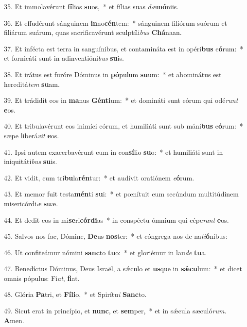 35. Et immolavérunt \textbf{fí}lios \textbf{su}os,~*  et fílias suas \textit{dæ}\textbf{mó}niis.\

36. Et effudérunt sánguinem \textbf{in}no\textbf{cén}tem:~*  sánguinem filiórum suórum et filiárum suárum, quas sacrificavérunt sculptíli\textit{bus} \textbf{Chá}naan.\

37. Et infécta est terra in sanguínibus, et contamináta est in opéri\textbf{bus} e\textbf{ó}rum:~*  et fornicáti sunt in adinventióni\textit{bus} \textbf{su}is.\

38. Et irátus est furóre Dóminus in \textbf{pó}pulum \textbf{su}um:~*  et abominátus est hereditá\textit{tem} \textbf{su}am.\

39. Et trádidit eos in \textbf{ma}nus \textbf{Gén}\textbf{ti}um:~*  et domináti sunt eórum qui odé\textit{runt} \textbf{e}os.\

40. Et tribulavérunt eos inimíci eórum, et humiliáti sunt sub máni\textbf{bus} e\textbf{ó}rum:~*  sæpe liberá\textit{vit} \textbf{e}os.\

41. Ipsi autem exacerbavérunt eum in con\textbf{sí}lio \textbf{su}o:~*  et humiliáti sunt in iniquitáti\textit{bus} \textbf{su}is.\

42. Et vidit, cum tri\textbf{bu}la\textbf{rén}tur:~*  et audívit oratiónem \textit{e}\textbf{ó}rum.\

43. Et memor fuit testa\textbf{mén}ti \textbf{su}i:~*  et pœnítuit eum secúndum multitúdinem misericórdi\textit{æ} \textbf{su}æ.\

44. Et dedit eos in mi\textbf{se}ri\textbf{cór}\textbf{di}as~*  in conspéctu ómnium qui cépe\textit{rant} \textbf{e}os.\

45. Salvos nos fac, Dómine, \textbf{De}us \textbf{nos}ter:~*  et cóngrega nos de na\textit{ti}\textbf{ó}nibus:\

46. Ut confiteámur nómini \textbf{sanc}to \textbf{tu}o:~*  et gloriémur in lau\textit{de} \textbf{tu}a.\

47. Benedíctus Dóminus, Deus Israël, a sǽculo et \textbf{us}que in \textbf{sǽ}\textbf{cu}lum:~*  et dicet omnis pópulus: Fi\textit{at}, \textbf{fi}at.\

48. Glória \textbf{Pa}tri, et \textbf{Fí}\textbf{li}o,~*  et Spirítu\textit{i} \textbf{Sanc}to.\

49. Sicut erat in princípio, et \textbf{nunc}, et \textbf{sem}per,~*  et in sǽcula sæculó\textit{rum}. \textbf{A}men.\

